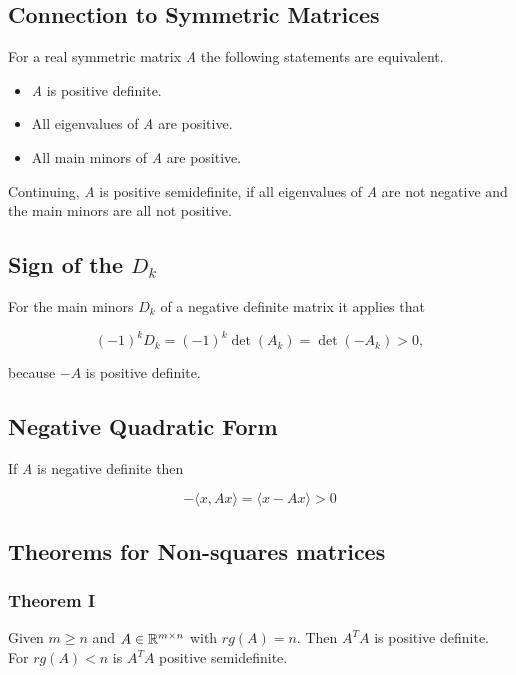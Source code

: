 \subsection{Connection to Symmetric Matrices}

For a real symmetric matrix \emph{A} the following statements are equivalent.

\begin{itemize}
    
    \item \emph{A} is positive definite.

    \item All eigenvalues of \emph{A} are positive.

    \item All main minors of \emph{A} are positive.

\end{itemize}

Continuing, \emph{A} is positive semidefinite, if all eigenvalues of \emph{A} are not negative and the 
main minors are all not positive.

\subsection{Sign of the \texorpdfstring{\(D_k\)}{}}

For the main minors \(D_k\) of a negative definite matrix it applies that 

\[
    (-1)^k D_k = (-1)^k \det(A_k) = \det(-A_k) > 0,
\]

because \(-A\) is positive definite.

\subsection{Negative Quadratic Form}

If \emph{A} is negative definite then 

\[
    -\langle x, Ax \rangle = \langle x -Ax \rangle > 0
\]

\subsection{Theorems for Non-squares matrices}

\subsubsection{Theorem I}

Given \(m \ge n\) and \(A \in \mathbb{R}^{m \times n}\) with \(rg(A) = n\). Then \(A^T A\) is positive 
definite. For \(rg(A) < n\) is \(A^T A\) positive semidefinite.
\vspace{\baselineskip}

